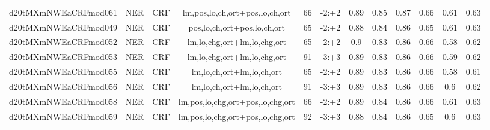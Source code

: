 \documentclass[a4paper]{article}
\begin{document}
\begin{landscape}
\begin{center}
\begin{tabular}{ |c|c|c|c|c|c|c|c|c|c|c|c|}
 	
 
 	
 		
 		\small{ d20tMXmNWEaCRFmod061 } & NER & CRF & lm,pos,lo,ch,ort+pos,lo,ch,ort  &  66 &  -2:+2  &  0.89 & 0.85 & 0.87  &  0.66 & 0.61 & 0.63 \\
 		

 	
 
 	
 		
 		\small{ d20tMXmNWEaCRFmod049 } & NER & CRF & pos,lo,ch,ort+pos,lo,ch,ort  &  65 &  -2:+2  &  0.88 & 0.84 & 0.86  &  0.65 & 0.61 & 0.63 \\
 		

 	
 
 	
 		
 		\small{ d20tMXmNWEaCRFmod052 } & NER & CRF & lm,lo,chg,ort+lm,lo,chg,ort  &  65 &  -2:+2  &  0.9 & 0.83 & 0.86  &  0.66 & 0.58 & 0.62 \\
 		

 	
 
 	
 		
 		\small{ d20tMXmNWEaCRFmod053 } & NER & CRF & lm,lo,chg,ort+lm,lo,chg,ort  &  91 &  -3:+3  &  0.89 & 0.83 & 0.86  &  0.66 & 0.59 & 0.62 \\
 		

 	
 
 	
 		
 		\small{ d20tMXmNWEaCRFmod055 } & NER & CRF & lm,lo,ch,ort+lm,lo,ch,ort  &  65 &  -2:+2  &  0.89 & 0.83 & 0.86  &  0.66 & 0.58 & 0.61 \\
 		

 	
 
 	
 		
 		\small{ d20tMXmNWEaCRFmod056 } & NER & CRF & lm,lo,ch,ort+lm,lo,ch,ort  &  91 &  -3:+3  &  0.89 & 0.83 & 0.86  &  0.66 & 0.6 & 0.62 \\
 		

 	
 
 	
 		
 		\small{ d20tMXmNWEaCRFmod058 } & NER & CRF & lm,pos,lo,chg,ort+pos,lo,chg,ort  &  66 &  -2:+2  &  0.89 & 0.84 & 0.86  &  0.66 & 0.61 & 0.63 \\
 		

 	
 
 	
 		
 		\small{ d20tMXmNWEaCRFmod059 } & NER & CRF & lm,pos,lo,chg,ort+pos,lo,chg,ort  &  92 &  -3:+3  &  0.88 & 0.84 & 0.86  &  0.65 & 0.6 & 0.63 \\
 		

 	
 
 	
 		

\end{tabular}
\end{center}
\end{landscape}
\end{document}
